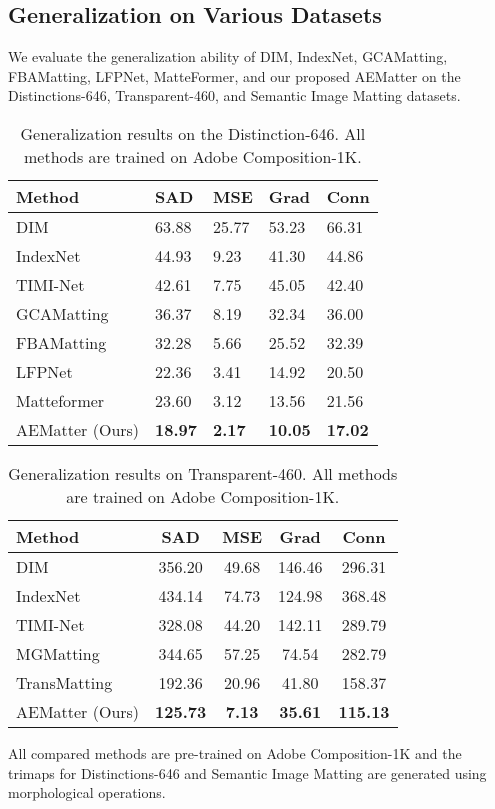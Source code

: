 \documentclass[10pt,twocolumn,letterpaper]{article}
\begin{document}
\subsection{Generalization on Various Datasets}
We evaluate the generalization ability of DIM, IndexNet, GCAMatting, FBAMatting, LFPNet, MatteFormer, and our proposed AEMatter on the Distinctions-646, Transparent-460, and Semantic Image Matting datasets.
\begin{table}[!t]
  \centering
  \caption{Generalization results on the Distinction-646. All methods are trained on Adobe Composition-1K.} \begin{tabularx}{\linewidth}{l|Z|Z|Z|Z}
        \toprule
    Method & {SAD} & {MSE} & {Grad} & {Conn} \\
    \midrule
    DIM~\cite{xu2017deep} &63.88 & 25.77 & 53.23 & 66.31 \\ IndexNet~\cite{lu2019indices} & 44.93 &9.23 & 41.30 &44.86\\ TIMI-Net~\cite{Liu_2021_ICCV} & 42.61 & 7.75& 45.05 & 42.40 \\ GCAMatting~\cite{li2020natural} & 36.37 &8.19 & 32.34 &36.00\\FBAMatting~\cite{forte2020fbamatting} & 32.28 &5.66 & 25.52 & 32.39 \\LFPNet~\cite{liu2021lfpnet} & 22.36 & 3.41& 14.92 & 20.50 \\ Matteformer~\cite{park2022matteformer} & 23.60 & 3.12 & 13.56 & 21.56 \\ \midrule
    AEMatter (Ours)   &\bf{18.97}&\bf{2.17}&\bf{10.05}&\bf{17.02}   \\  
    \bottomrule
    \end{tabularx}\vspace{-0.2cm}
  \label{tab:d646}\end{table}\begin{table}[!t]
  \centering
  {
  \caption{Generalization results on Transparent-460. All methods are trained on Adobe Composition-1K.}
    \begin{tabular}{l|c|c|c|c}
    \toprule
    Method & {SAD} & {MSE} & {Grad} & {Conn} \\
    \midrule
    DIM~\cite{xu2017deep} &356.20& 49.68& 146.46 &296.31\\
    IndexNet~\cite{lu2019indices} & 434.14 &74.73 &124.98& 368.48\\
    TIMI-Net~\cite{Liu_2021_ICCV} & 328.08& 44.20 &142.11& 289.79\\
    MGMatting~\cite{yu2020mask} &344.65 &57.25 &74.54& 282.79\\
    TransMatting~\cite{cai2022TransMatting} & 192.36& 20.96& 41.80 &158.37\\
\midrule
    AEMatter (Ours)    & \bf{125.73}& \bf{7.13}& \bf{35.61}& \bf{115.13} \\ 
    \bottomrule
    \end{tabular}\label{tab:460}}
\end{table}All compared methods are pre-trained on Adobe Composition-1K and the trimaps for Distinctions-646 and Semantic Image Matting are generated using morphological operations.
\end{document}
